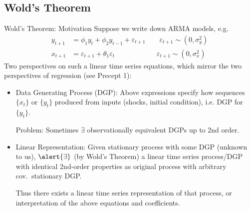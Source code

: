 \documentclass[aspectratio=169, handout]{beamer}
\newcommand{\Var}{\operatorname{Var}}
\begin{document}
\subsection{Wold's Theorem}

{\footnotesize
\begin{frame}{Wold's Theorem: Motivation}
Suppose we write down ARMA models, e.g.
\begin{align*}
  y_{t+1} &= \phi_1 y_{t} + \phi_2 y_{t-1} + \varepsilon_{t+1}
  \qquad
  \varepsilon_{t+1} \sim (0,\sigma^2_y)
  \\
  x_{t+1} &= \varepsilon_{t+1} + \theta_1\varepsilon_{t}
  \qquad\qquad\qquad
  \varepsilon_{t+1} \sim (0,\sigma^2_x)
\end{align*}
Two perspectives on such a linear time series equations, which mirror
the two perspectives of regression (see Precept 1):
\begin{itemize}
  \item \alert{Data Generating Process (DGP)}:
    Above expressions specify how sequences $\{x_t\}$ or $\{y_t\}$
    produced from inputs (shocks, initial condition), i.e.
    DGP for $\{y_t\}$.

    \alert{Problem}: Sometimes $\exists$ observationally equivalent DGPs
    up to 2nd order.


  \pause
  \item \alert{Linear Representation}:
    Given stationary process with \alert{some DGP} (unknown to us),
    $\alert{\exists}$ (by Wold's Theorem) a linear time series
    process/DGP with \alert{identical} 2nd-order properties as
    \alert{original} process with \alert{arbitrary} cov.\
    stationary DGP.

    Thus there exists a linear time series \alert{representation} of
    that process, or interpretation of the above equations and
    coefficients.
\end{itemize}
\end{frame}
}


\end{document}
